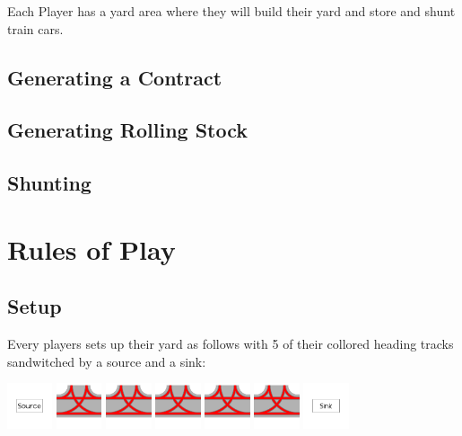 \documentclass[12pt, letterpaper]{article}
\begin{document}
Each Player has a yard area where they will build their yard and store and shunt train cars.

\subsection{Generating a Contract}

\subsection{Generating Rolling Stock}

\subsection{Shunting}

\newpage

\section{Rules of Play}

\subsection{Setup}

Every players sets up their yard as follows with 5 of their collored heading tracks sandwitched by a source and a sink:

\includegraphics[width=0.10\textwidth]{Source.png}
\includegraphics[width=0.10\textwidth]{RedHeading.png}
\includegraphics[width=0.10\textwidth]{RedHeading.png}
\includegraphics[width=0.10\textwidth]{RedHeading.png}
\includegraphics[width=0.10\textwidth]{RedHeading.png}
\includegraphics[width=0.10\textwidth]{RedHeading.png}
\includegraphics[width=0.10\textwidth]{Sink.png}
\end{document}
